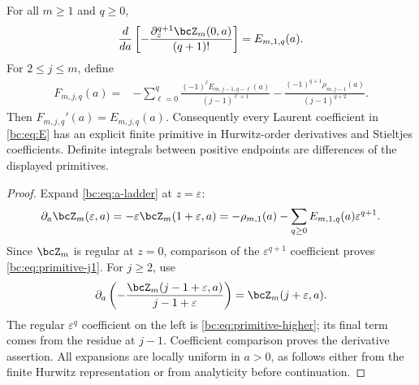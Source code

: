 \begin{theorem}
\label{bc:thm:primitives}
For all $m\ge1$ and $q\ge0$,
\begin{equation}\label{bc:eq:primitive-j1}
 \frac{d}{da}\left[-\frac{\partial_z^{q+1}\bcZ_m(0,a)}{(q+1)!}\right]
        =E_{m,1,q}(a).
\end{equation}
For $2\le j\le m$, define
\begin{align}
 F_{m,j,q}(a)={}&-
  \sum_{\ell=0}^{q}\frac{(-1)^\ell E_{m,j-1,q-\ell}(a)}{(j-1)^{\ell+1}}
  -\frac{(-1)^{q+1}\rho_{m,j-1}(a)}{(j-1)^{q+2}}.
 \label{bc:eq:primitive-higher}
\end{align}
Then $F_{m,j,q}'(a)=E_{m,j,q}(a)$. Consequently every Laurent
coefficient in \eqref{bc:eq:E} has an explicit finite primitive in
Hurwitz-order derivatives and Stieltjes coefficients. Definite
integrals between positive endpoints are differences of the displayed
primitives.
\end{theorem}
\begin{proof}
Expand \eqref{bc:eq:a-ladder} at $z=\varepsilon$:
\[
 \partial_a\bcZ_m(\varepsilon,a)
   =-\varepsilon\bcZ_m(1+\varepsilon,a)
   =-\rho_{m,1}(a)-\sum_{q\ge0}E_{m,1,q}(a)\varepsilon^{q+1}.
\]
Since $\bcZ_m$ is regular at $z=0$, comparison of the
$\varepsilon^{q+1}$ coefficient proves
\eqref{bc:eq:primitive-j1}. For $j\ge2$, use
\[
 \partial_a\left(-\frac{\bcZ_m(j-1+\varepsilon,a)}{j-1+\varepsilon}\right)
     =\bcZ_m(j+\varepsilon,a).
\]
The regular $\varepsilon^q$ coefficient on the left is
\eqref{bc:eq:primitive-higher}; its final term comes from the residue at
$j-1$. Coefficient comparison proves the derivative assertion. All
expansions are locally uniform in $a>0$, as follows either from the
finite Hurwitz representation or from analyticity before continuation.
\end{proof}

